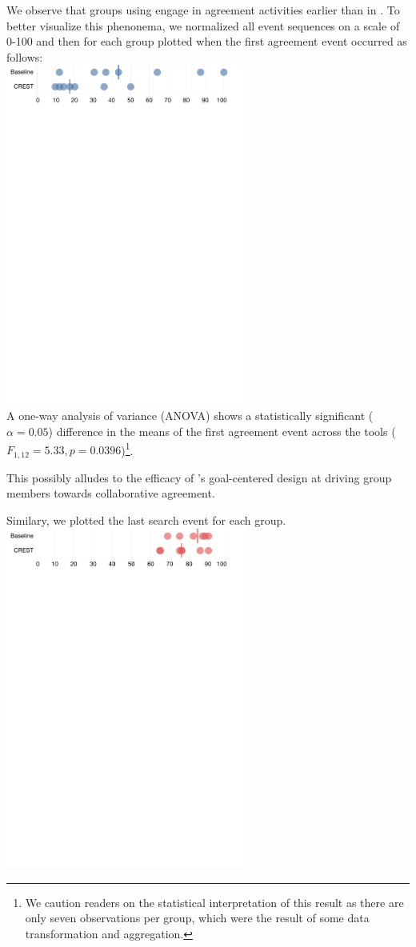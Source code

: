 We observe that groups using \tool engage in agreement activities earlier than in \baseline. To better visualize this phenonema, we normalized all event sequences on a scale of 0-100 and then for each group plotted when the first agreement event occurred as follows:\\[0.1cm]
\includegraphics[width=300px]{images/Agree.pdf}\\[0.1cm]
A one-way analysis of variance (ANOVA) shows a statistically significant ($\alpha = 0.05$) difference in the means of the first agreement event across the tools ($F_{1, 12} = 5.33, p = 0.0396$)\footnote{We caution readers on the statistical interpretation of this result as there are only seven observations per group, which were the result of some data transformation and aggregation.}.


This possibly alludes to the efficacy of \tool's goal-centered design at driving group members towards collaborative agreement. 


Similary, we plotted the last search event for each group. \\[0.2cm]
\includegraphics[width=300px]{images/Search.pdf}\\


